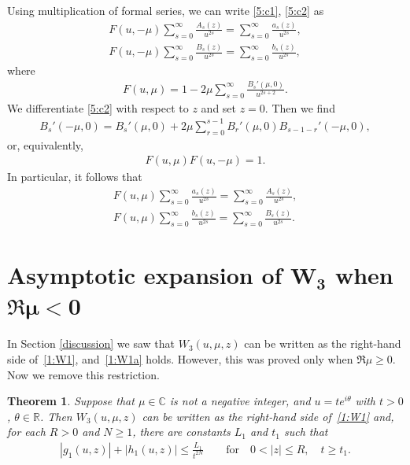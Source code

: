 \documentclass[pdftex]{sigma}
\newcommand{\R}{\mathbb{R}}
\newcommand{\C}{\mathbb{C}}
\numberwithin{equation}{section}
\newtheorem{Theorem}{Theorem}[section]
\begin{document}
Using multiplication of formal series, we can write \eqref{5:c1}, \eqref{5:c2} as
\begin{gather}
F(u,-\mu)\sum_{s=0}^\infty \frac{A_s(z)}{u^{2s}} = \sum_{s=0}^\infty \frac{a_s(z)}{u^{2s}},\label{5:formal1}\\
F(u,-\mu)\sum_{s=0}^\infty \frac{B_s(z)}{u^{2s}} = \sum_{s=0}^\infty \frac{b_s(z)}{u^{2s}},\label{5:formal2}
\end{gather}
where
\begin{gather*}%
F(u,\mu)=1-2\mu\sum_{s=0}^\infty \frac{B_s'(\mu,0)}{u^{2s+2}}.
\end{gather*}
We dif\/ferentiate \eqref{5:c2} with respect to $z$ and set $z=0$.
Then we f\/ind
\begin{gather*}%
B_s'(-\mu,0)=B_s'(\mu,0)+2\mu\sum_{r=0}^{s-1} B_r'(\mu,0)B_{s-1-r}'(-\mu,0),
\end{gather*}
or, equivalently,
\begin{gather}\label{5:reciprocal}
F(u,\mu)F(u,-\mu)=1 .
\end{gather}
In particular, it follows that
\begin{gather}
F(u,\mu)\sum_{s=0}^\infty \frac{a_s(z)}{u^{2s}}=\sum_{s=0}^\infty \frac{A_s(z)}{u^{2s}},\label{5:formal3}\\
F(u,\mu)\sum_{s=0}^\infty \frac{b_s(z)}{u^{2s}}=\sum_{s=0}^\infty \frac{B_s(z)}{u^{2s}}.\label{5:formal4}
\end{gather}

\section[Asymptotic expansion of $W_3$ when $\Re\mu<0$]{Asymptotic expansion of $\boldsymbol{W_3}$ when $\boldsymbol{\Re\mu<0}$} \label{W3}

In Section \ref{discussion} we saw that $W_3(u,\mu,z)$ can be written as the right-hand side of~\eqref{1:W1}, and~\eqref{1:W1a} holds.
However, this was proved only when $\Re\mu\ge 0$. Now we remove this restriction.

\begin{Theorem}\label{6:t1}
Suppose that $\mu\in\C$ is not a negative integer, and $u=te^{i\theta}$ with $t>0$, $\theta\in\R$.
Then $W_3(u,\mu,z)$ can be written as the right-hand side of~\eqref{1:W1} and, for each $R>0$ and $N\ge 1$, there are constants $L_1$ and $t_1$ such that
\begin{gather*}%
|g_1(u,z)|+|h_1(u,z)|\le \frac{L_1}{t^{2N}}\qquad \text{for} \quad 0<|z|\le R, \quad t\ge t_1.
\end{gather*}
\end{Theorem}
\end{document}
